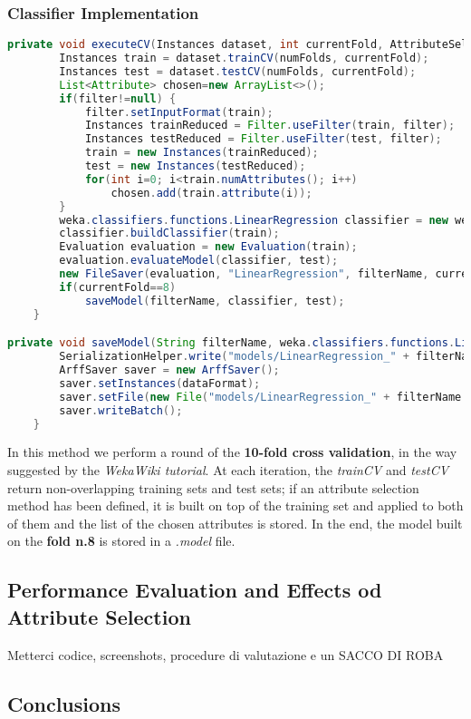 \subsubsection{Classifier Implementation}
\begin{lstlisting}[language=Java]
private void executeCV(Instances dataset, int currentFold, AttributeSelection filter, String filterName) throws Exception {
        Instances train = dataset.trainCV(numFolds, currentFold);
        Instances test = dataset.testCV(numFolds, currentFold);
        List<Attribute> chosen=new ArrayList<>();
        if(filter!=null) {
            filter.setInputFormat(train);
            Instances trainReduced = Filter.useFilter(train, filter);
            Instances testReduced = Filter.useFilter(test, filter);
            train = new Instances(trainReduced);
            test = new Instances(testReduced);
            for(int i=0; i<train.numAttributes(); i++)
                chosen.add(train.attribute(i));
        }
        weka.classifiers.functions.LinearRegression classifier = new weka.classifiers.functions.LinearRegression();
        classifier.buildClassifier(train);
        Evaluation evaluation = new Evaluation(train);
        evaluation.evaluateModel(classifier, test);
        new FileSaver(evaluation, "LinearRegression", filterName, currentFold, chosen).save();
        if(currentFold==8)
            saveModel(filterName, classifier, test);
    }

private void saveModel(String filterName, weka.classifiers.functions.LinearRegression classifier, Instances dataFormat) throws Exception{
        SerializationHelper.write("models/LinearRegression_" + filterName + ".model", classifier);
        ArffSaver saver = new ArffSaver();
        saver.setInstances(dataFormat);
        saver.setFile(new File("models/LinearRegression_" + filterName + "_data.arff"));
        saver.writeBatch();
    }
\end{lstlisting}

In this method we perform a round of the \textbf{10-fold cross validation}, in the way suggested by the \textit{WekaWiki tutorial}. At each iteration, the \textit{trainCV} and \textit{testCV} return non-overlapping training sets and test sets; if an attribute selection method has been defined, it is built on top of the training set and applied to both of them and the list of the chosen attributes is stored. In the end, the model built on the \textbf{fold n.8} is stored in a \textit{.model} file. 

\subsection{Performance Evaluation and Effects od Attribute Selection}
Metterci codice, screenshots, procedure di valutazione e un SACCO DI ROBA

\subsection{Conclusions}